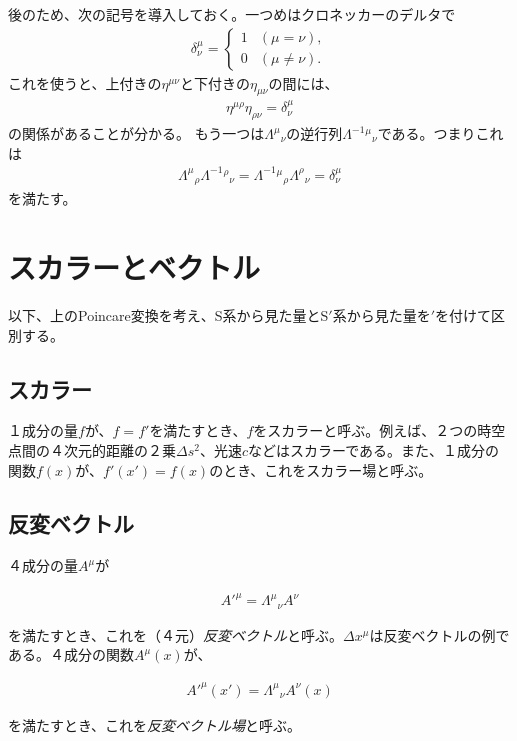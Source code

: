\documentclass[report,paper=a4, fontsize=12pt, line_length=16cm, number_of_lines=33,dvipdfmx]{jlreq}
\newenvironment{important}{\begin{tcolorbox}[
  colback = white,
  colframe = red!35,
  boxrule = 2mm,
  fonttitle = \bfseries,
  after = \noindent] }{\end{tcolorbox}}
\numberwithin{equation}{chapter}
\newcommand{\Sp}{S$'$}
\begin{document}
後のため、次の記号を導入しておく。一つめはクロネッカーのデルタで
\begin{align}
\delta^{\mu}_{\nu}
=
\begin{cases}
1&(\mu=\nu),\\
0 &(\mu\ne\nu).
\end{cases}
\end{align}
これを使うと、上付きの$\eta^{\mu\nu}$と下付きの$\eta_{\mu\nu}$の間には、
\begin{align}
\eta^{\mu\rho}\eta_{\rho\nu}=\delta^{\mu}_{\nu}
\end{align}
の関係があることが分かる。
もう一つは$\Lambda^{\mu}{}_{\nu}$の逆行列$\Lambda^{-1}{}^{\mu}{}_{\nu}$である。つまりこれは
\begin{align}
\Lambda^{\mu}{}_{\rho}\Lambda^{-1}{}^{\rho}{}_{\nu}=\Lambda^{-1}{}^{\mu}{}_{\rho}\Lambda^{\rho}{}_{\nu}=\delta^{\mu}_{\nu}
\end{align}
を満たす。
\section{スカラーとベクトル}
以下、上のPoincare変換を考え、S系から見た量と\Sp 系から見た量を$'$を付けて区別する。

\subsection{スカラー}
１成分の量$f$が、$f=f'$を満たすとき、$f$をスカラーと呼ぶ。例えば、２つの時空点間の４次元的距離の２乗$\Delta s^{2}$、光速$c$などはスカラーである。また、１成分の関数$f(x)$が、$f'(x')=f(x)$のとき、これをスカラー場と呼ぶ。

\subsection{反変ベクトル}
４成分の量$A^{\mu}$が
\begin{important}
\begin{align}
A'^{\mu}=\Lambda^{\mu}{}_{\nu}A^{\nu}
\end{align}
\end{important}
を満たすとき、これを（４元）\emph{反変ベクトル}と呼ぶ。$\Delta x^{\mu}$は反変ベクトルの例である。４成分の関数$A^{\mu}(x)$が、
\begin{important}
\begin{align}
A'^{\mu}(x')=\Lambda^{\mu}{}_{\nu}A^{\nu}(x)
\end{align}
\end{important}
を満たすとき、これを\emph{反変ベクトル場}と呼ぶ。
\end{document}
